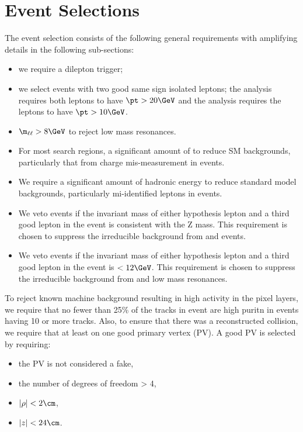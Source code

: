 \section{Event Selections}
\label{sec:evtsel_evt}
The event selection consists of the following general requirements with
amplifying details in the following sub-sections:
\begin{itemize}
\item we require a dilepton trigger;
\item we select events with two good same sign isolated leptons; the \hpt
analysis requires both leptons to have $\pt > 20 \GeV$ and the \lpt analysis
requires the leptons to have $\pt > 10 \GeV$.
\item $\m_{\ell\ell} > 8 \GeV$ to reject low mass resonances.
\item For most search regions, a significant amount of \met to reduce SM
backgrounds, particularly that from charge mis-measurement in \Zll events.
\item We require a significant amount of hadronic energy to reduce standard
model backgrounds, particularly mi-identified leptons in \Wj events.
\item We veto events if the invariant mass of either hypothesis lepton and a
third good lepton in the event is consistent with the Z mass. This requirement
is chosen to suppress the irreducible background from \WZ and \ZZ events.
\item We veto events if the invariant mass of either hypothesis lepton and a
third good lepton in the event is $< 12 \GeV$. This requirement is chosen to
suppress the irreducible background from \gs and low mass resonances.
\end{itemize}

To reject known machine background resulting in high activity in the pixel
layers, we require that no fewer than 25\% of the tracks in event are high
puritn in events having 10 or more tracks. Also, to ensure that there was a
reconstructed collision, we require that at least on one good primary vertex
(PV). A good PV is selected by requiring:
\begin{itemize}
\item the PV is not considered a fake,
\item the number of degrees of freedom > 4,
\item $|\rho| < 2 \cm$,
\item $|z| < 24 \cm$.
\end{itemize}

